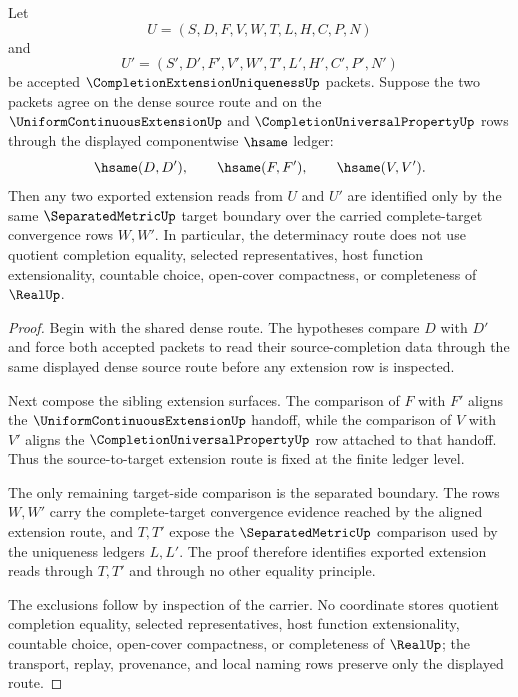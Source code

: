 \begin{theorem}
\label{thm:completion-extension-uniqueness-separated-determinacy}
Let
$$
U=(S,D,F,V,W,T,L,H,C,P,N)
$$
and
$$
U'=(S',D',F',V',W',T',L',H',C',P',N')
$$
be accepted $\CompletionExtensionUniquenessUp$ packets. Suppose the two packets agree on the dense source route and on the $\UniformContinuousExtensionUp$ and $\CompletionUniversalPropertyUp$ rows through the displayed componentwise $\hsame$ ledger:
$$
\hsame(D,D'),\qquad \hsame(F,F'),\qquad \hsame(V,V').
$$
Then any two exported extension reads from $U$ and $U'$ are identified only by the same $\SeparatedMetricUp$ target boundary over the carried complete-target convergence rows $W,W'$. In particular, the determinacy route does not use quotient completion equality, selected representatives, host function extensionality, countable choice, open-cover compactness, or completeness of $\RealUp$.
\end{theorem}
\begin{proof}
Begin with the shared dense route. The hypotheses compare $D$ with $D'$ and force both accepted packets to read their source-completion data through the same displayed dense source route before any extension row is inspected.

Next compose the sibling extension surfaces. The comparison of $F$ with $F'$ aligns the $\UniformContinuousExtensionUp$ handoff, while the comparison of $V$ with $V'$ aligns the $\CompletionUniversalPropertyUp$ row attached to that handoff. Thus the source-to-target extension route is fixed at the finite ledger level.

The only remaining target-side comparison is the separated boundary. The rows $W,W'$ carry the complete-target convergence evidence reached by the aligned extension route, and $T,T'$ expose the $\SeparatedMetricUp$ comparison used by the uniqueness ledgers $L,L'$. The proof therefore identifies exported extension reads through $T,T'$ and through no other equality principle.

The exclusions follow by inspection of the carrier. No coordinate stores quotient completion equality, selected representatives, host function extensionality, countable choice, open-cover compactness, or completeness of $\RealUp$; the transport, replay, provenance, and local naming rows preserve only the displayed route.
\end{proof}


